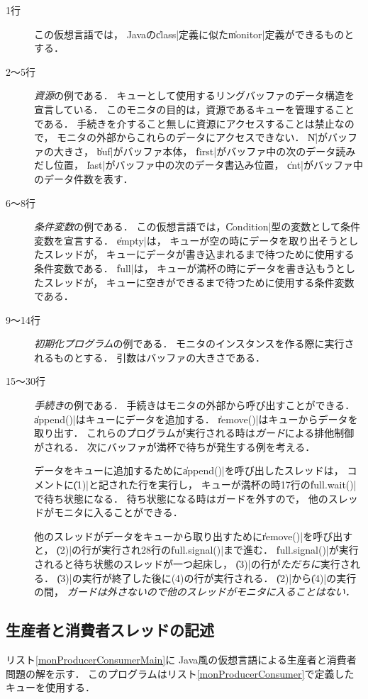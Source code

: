 \begin{description}
\item [1行] この仮想言語では，
  Javaの\|class|定義に似た\|monitor|定義ができるものとする．
\item [2〜5行] \emph{資源}の例である．
  キューとして使用するリングバッファのデータ構造を宣言している．
  このモニタの目的は，資源であるキューを管理することである．
  手続きを介すること無しに資源にアクセスすることは禁止なので，
  モニタの外部からこれらのデータにアクセスできない．
  \|N|がバッファの大きさ，
  \|buf|がバッファ本体，
  \|first|がバッファ中の次のデータ読みだし位置，
  \|last|がバッファ中の次のデータ書込み位置，
  \|cnt|がバッファ中のデータ件数を表す．
\item [6〜8行] \emph{条件変数}の例である．
  この仮想言語では，\|Condition|型の変数として条件変数を宣言する．
  \|empty|は，
  キューが空の時にデータを取り出そうとしたスレッドが，
  キューにデータが書き込まれるまで待つために使用する条件変数である．
  \|full|は，
  キューが満杯の時にデータを書き込もうとしたスレッドが，
  キューに空きができるまで待つために使用する条件変数である．
\item [9〜14行] \emph{初期化プログラム}の例である．
  モニタのインスタンスを作る際に実行されるものとする．
  引数はバッファの大きさである．
\item [15〜30行] \emph{手続き}の例である．
  手続きはモニタの外部から呼び出すことができる．
  \|append()|はキューにデータを追加する．
  \|remove()|はキューからデータを取り出す．
  これらのプログラムが実行される時は\emph{ガード}による排他制御がされる．
  次にバッファが満杯で待ちが発生する例を考える．

  データをキューに追加するために\|append()|を呼び出したスレッドは，
  コメントに\|(1)|と記された行を実行し，
  キューが満杯の時17行の\|full.wait()|で待ち状態になる．
  待ち状態になる時はガードを外すので，
  他のスレッドがモニタに入ることができる．

  他のスレッドがデータをキューから取り出すために\|remove()|を呼び出すと，
  \|(2)|の行が実行され28行の\|full.signal()|まで進む．
  \|full.signal()|が実行されると待ち状態のスレッドが一つ起床し，
  \|(3)|の行が\emph{ただちに}実行される．
  \|(3)|の実行が終了した後に(4)の行が実行される．
  \|(2)|から\|(4)|の実行の間，
  \emph{ガードは外さないので他のスレッドがモニタに入ることはない．}
\end{description}

\subsection{生産者と消費者スレッドの記述}
リスト\ref{monProducerConsumerMain}に
Java風の仮想言語による生産者と消費者問題の解を示す．
このプログラムはリスト\ref{monProducerConsumer}で定義したキューを使用する．

